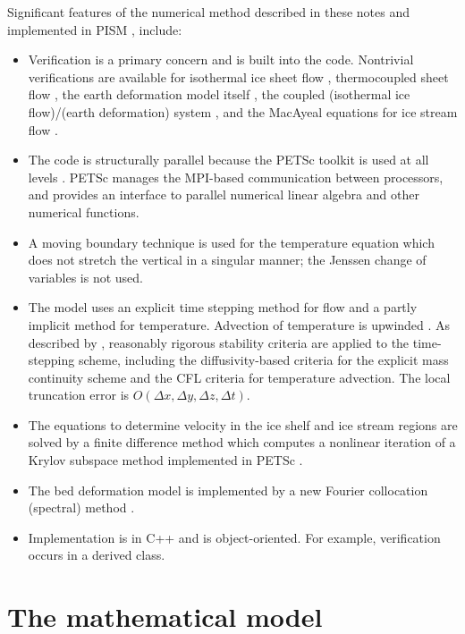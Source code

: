 \documentclass[12pt,final]{amsart}%
\theoremstyle{plain}
\theoremstyle{definition}
\theoremstyle{remark}
\begin{document}
Significant features of the numerical method described in these notes and implemented in PISM \citep{pism-web-page}, include:\begin{itemize}
\item Verification \citep{Roache} is a primary concern and is built into the code.  Nontrivial verifications are available for isothermal ice sheet flow \citep{BLKCB}, thermocoupled sheet flow \citep{BB,BBL}, the earth deformation model itself \citep{BLKfastearth}, the coupled (isothermal ice flow)/(earth deformation) system \citep{BLKfastearth}, and the MacAyeal equations for ice stream flow \citep{BrownPresentation}.
\item The code is structurally parallel because the PETSc toolkit is used at all levels \citep{petsc-web-page,petsc-user-ref}.  PETSc manages the MPI-based communication between processors, and provides an interface to parallel numerical linear algebra and other numerical functions.
\item A moving boundary technique is used for the temperature equation which does not stretch the vertical in a singular manner; the Jenssen \citep{Jenssen} change of variables is not used.
\item The model uses an explicit time stepping method for flow and a partly implicit method for temperature.  Advection of temperature is upwinded \citep{MortonMayers}.  As described by  \citet{BBL}, reasonably rigorous stability criteria are applied to the time-stepping scheme, including the diffusivity-based criteria for the explicit mass continuity scheme and the CFL criteria \citep{MortonMayers} for temperature advection.  The local truncation error is $O(\Delta x,\Delta y,\Delta z,\Delta t)$.
\item The equations to determine velocity in the ice shelf and ice stream regions are solved by a finite difference method which computes a nonlinear iteration of a Krylov subspace method implemented in PETSc \citep{BrownPresentation,petsc-web-page,petsc-user-ref}.
\item The bed deformation model is implemented by a new Fourier collocation (spectral) method \citep{BLKfastearth}.
\item Implementation is in C++ and is object-oriented.  For example, verification occurs in a derived class.
\end{itemize}


\newpage
\section{The mathematical model}
\label{mathmodelsect}
\end{document}
